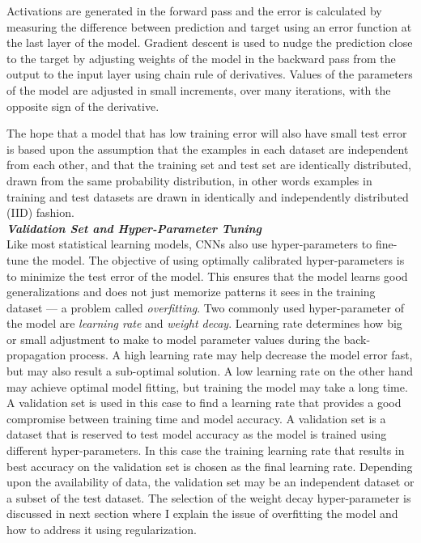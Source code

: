 \documentclass [11pt,letterpaper ,openany ]{report}
\begin{document}
    Activations are generated in the forward pass and the error is calculated by measuring the difference between prediction and target using an error function at the last layer of the model. Gradient descent is used to nudge the prediction close to the target by adjusting weights of the model in the backward pass from the output to the input layer using chain rule of derivatives. Values of the parameters of the model are adjusted in small increments, over many iterations, with the opposite sign of the derivative.

    The hope that a model that has low training error will also have small test error is based upon the assumption that the examples in each dataset are independent from each other, and that the training set and test set are identically distributed, drawn from the same probability distribution, in other words examples in training and test datasets are drawn in identically and independently distributed (IID) fashion.\\

    
    \noindent
    \textbf{\textit{Validation Set and Hyper-Parameter Tuning}}\\
    Like most statistical learning models, CNNs also use hyper-parameters to fine-tune the model. The objective of using optimally calibrated hyper-parameters is to minimize the test error of the model. This ensures that the model learns good generalizations and does not just memorize patterns it sees in the training dataset --- a problem called \textit{overfitting}. Two commonly used hyper-parameter of the model are \textit{learning rate} and \textit{weight decay}. Learning rate determines how big or small adjustment to make to model parameter values during the back-propagation process. A high learning rate may help decrease the model error fast, but may also result a sub-optimal solution. A low learning rate on the other hand may achieve optimal model fitting, but training the model may take a long time. A validation set is used in this case to find a learning rate that provides a good compromise between training time and model accuracy. A validation set is a dataset that is reserved to test model accuracy as the model is trained using different hyper-parameters. In this case the training learning rate that results in best accuracy on the validation set is chosen as the final learning rate. Depending upon the availability of data, the validation set may be an independent dataset or a subset of the test dataset. The selection of the weight decay hyper-parameter is discussed in next section where I explain the issue of overfitting the model and how to address it using regularization.\\
\end{document}
